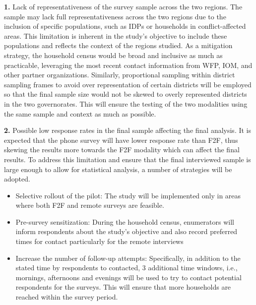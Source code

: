\documentclass[11pt,harvard]{article}
\begin{document}
	\textbf{1.} Lack of representativeness of the survey sample across the two regions. The sample may lack full representativeness across the two regions due to the inclusion of specific populations, such as IDPs or households in conflict-affected areas. This limitation is inherent in the study’s objective to include these populations and reflects the context of the regions studied. As a mitigation strategy, the household census would be broad and inclusive as much as practicable, leveraging the most recent contact information from WFP, IOM, and other partner organizations. Similarly, proportional sampling within district sampling frames to avoid over representation of certain districts will be employed so that the final sample size would not be skewed to overly represented districts in the two governorates. This will ensure the testing of the two modalities using the same sample and context as much as possible.
	
	\textbf{2.} Possible low response rates in the final sample affecting the final analysis. It is expected that the phone survey will have lower response rate than F2F, thus skewing the results more towards the F2F modality which can affect the final results. To address this limitation and ensure that the final interviewed sample is large enough to allow for statistical analysis, a number of strategies will be adopted. 
	\begin{itemize}
		\item Selective rollout of the pilot: The study will be implemented only in areas where both F2F and remote surveys are feasible.
		\item Pre-survey sensitization: During the household census, enumerators will inform respondents about the study's objective and also record preferred times for contact particularly for the remote interviews
		\item Increase the number of follow-up attempts: Specifically, in addition to the stated time by respondents to contacted, 3 additional time windows, i.e., mornings, afternoons and evenings will be used to try to contact potential respondents for the surveys. This will ensure that more households are reached within the survey period.
	\end{itemize}  
	
\end{document}
